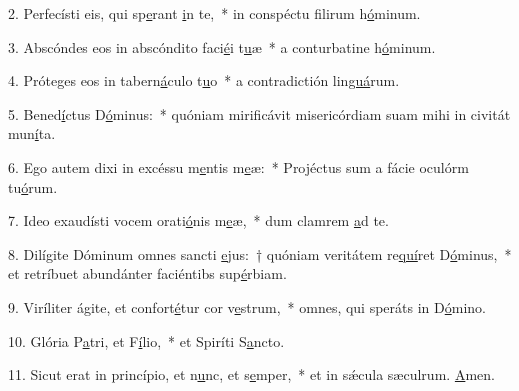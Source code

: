 2. Perfecísti eis, qui sp\uline{e}rant \uline{i}n te,~* in conspéctu filirum h\uline{ó}minum.\par 
3. Abscóndes eos in abscóndito faci\uline{é}i t\uline{u}æ~* a conturbatine h\uline{ó}minum.\par 
4. Próteges eos in tabern\uline{á}culo t\uline{u}o~* a contradictión lin\uline{guá}rum.\par 
5. Bened\uline{í}ctus D\uline{ó}minus:~* quóniam mirificávit misericórdiam suam mihi in civitát mun\uline{í}ta.\par 
6. Ego autem dixi in excéssu m\uline{e}ntis m\uline{e}æ:~* Projéctus sum a fácie oculórm tu\uline{ó}rum.\par 
7. Ideo exaudísti vocem orati\uline{ó}nis m\uline{e}æ,~* dum clamrem \uline{a}d te.\par 
8. Dilígite Dóminum omnes sancti \uline{e}jus:~† quóniam veritátem re\uline{quí}ret D\uline{ó}minus,~* et retríbuet abundánter faciéntibs sup\uline{é}rbiam.\par 
9. Viríliter ágite, et confort\uline{é}tur cor v\uline{e}strum,~* omnes, qui speráts in D\uline{ó}mino.\par 
10. Glória P\uline{a}tri, et F\uline{í}lio,~* et Spiríti S\uline{a}ncto.\par 
11. Sicut erat in princípio, et n\uline{u}nc, et s\uline{e}mper,~* et in sǽcula sæculrum. \uline{A}men.\par 
